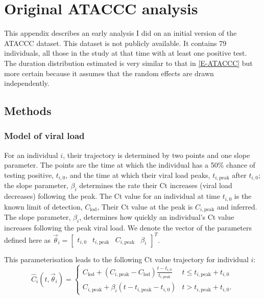 \documentclass[thesis.tex]{subfiles}
\begin{document}
\chapter{Original ATACCC analysis} \label{ATACCC:sec:original-analysis}


This appendix describes an early analysis I did on an initial version of the ATACCC dataset.
This dataset is not publicly available.
It contains 79 individuals, all those in the study at that time with at least one positive test.
The duration distribution estimated is very similar to that in \cref{E-ATACCC} but more certain because it assumes that the random effects are drawn independently.

\section{Methods}

\subsection{Model of viral load}

For an individual $i$, their trajectory is determined by two points and one slope parameter.
The points are the time at which the individual has a 50\% chance of testing positive, $t_{i,0}$, and the time at which their viral load
peaks, $t_{i,\text{peak}}$ after $t_{i,0}$; the slope parameter, $\beta_i$ determines the rate their Ct increases (viral load decreases) following the peak.
The Ct value for an individual at time $t_{i,0}$ is the known limit of detection, $C_\text{lod}$,
Their Ct value at the peak is $C_{i,\text{peak}}$ and inferred.
The slope parameter, $\beta_i$, determines how quickly an individual's Ct value increases following the peak viral load.
We denote the vector of the parameters defined here as $\vec\theta_i = \begin{bmatrix} t_{i,0} & t_{i,\text{peak}} & C_{i,\text{peak}} &  \beta_i \end{bmatrix}^T$.

This parameterisation leads to the following Ct value trajectory for individual $i$:
$$
\hat{C}_i(t, \vec\theta_i) = \begin{cases}
  C_{\text{lod}} + (C_{i,\text{peak}} - C_{\text{lod}}) \frac{t - t_{i,0}}{t_{i,\text{peak}}}
    &t \leq t_{i,\text{peak}} + t_{i,0} \\
  C_{i,\text{peak}} + \beta_i (t - t_{i,\text{peak}} - t_{i,0})
    &t > t_{i,\text{peak}} + t_{i,0}.
\end{cases}
$$
\end{document}
